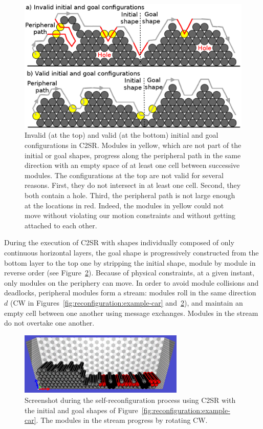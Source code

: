 \begin{figure}[!h]
	\centering
	\includegraphics[width=0.7\linewidth]{images/reconfiguration/admissibility}
	\caption{Invalid (at the top) and valid (at the bottom) initial and goal configurations in C2SR. Modules in yellow, which are not part of the initial or goal shapes, progress along the peripheral path in the same direction with an empty space of at least one cell between successive modules. The configurations at the top are not valid for several reasons. First, they do not intersect in at least one cell. Second, they both contain a hole. Third, the peripheral path is not large enough at the locations in red. Indeed, the modules in yellow could not move without violating our motion constraints and without getting attached to each other.}
	\label{fig:reconfiguration:admissibility}
\end{figure}

During the execution of C2SR with shapes individually composed of only continuous horizontal layers, the goal shape is progressively constructed from the bottom layer to the top one by stripping the initial shape, module by module in reverse order (see Figure~\ref{fig:reconfiguration:car-construction-process}). Because of physical constraints, at a given instant, only modules on the periphery can move. In order to avoid module collisions and deadlocks, peripheral modules form a stream: modules roll in the same direction $d$ (CW in Figures~\ref{fig:reconfiguration:example-car} and~\ref{fig:reconfiguration:car-construction-process}), and maintain an empty cell between one another using message exchanges. Modules in the stream do not overtake one another.

\begin{figure}[!h]
	\centering
	\includegraphics[width=0.7\textwidth]{images/reconfiguration/car-construction-process}
	\caption{Screenshot during the self-reconfiguration process using C2SR with the initial and goal shapes of Figure~\ref{fig:reconfiguration:example-car}. The modules in the stream progress by rotating CW.}
	\label{fig:reconfiguration:car-construction-process}
\end{figure}

